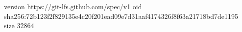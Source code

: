 version https://git-lfs.github.com/spec/v1
oid sha256:72b123f2f829135e4c20f201ead09e7d31aaf4174326f8f63a21718bd7de1195
size 32864
